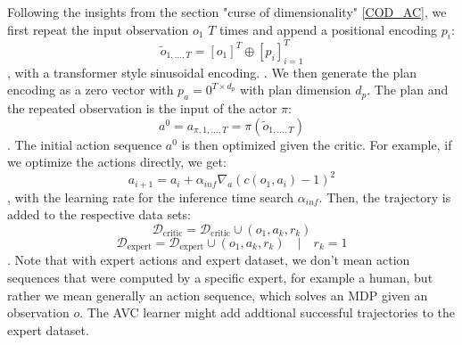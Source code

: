 Following the insights from the section "curse of dimensionality" \ref{COD_AC}, we first repeat the input observation $o_1$ $T$ times and append a positional encoding $p_i$:
\begin{equation}
    \label{eq:seq_emb}
    \tilde{o}_{1, ..., T} = [o_1]^T \oplus [p_i]_{i=1}^T
\end{equation}
, with a transformer style sinusoidal encoding.
. We then generate the plan encoding as a zero vector with $p_a = 0^{T \times d_p}$ with plan dimension $d_p$. The plan and the repeated observation is the input 
of the actor $\pi$:
\begin{equation}
    a^0 = a_{\pi, 1,...,T} = \pi(\tilde{o}_{1, ..., T})
\end{equation}
. The initial action sequence $a^0$ is then optimized given the critic. For example, if we optimize the actions directly, we get:
\begin{equation*}
    a_{i+1} = a_i + \alpha_{inf}\nabla_{a} (c(o_1, a_i) - 1)^2
\end{equation*}
, with the learning rate for the inference time search $\alpha_{inf}$. Then, the trajectory is added to the respective data sets:
\begin{equation}
    \mathcal{D}_{\text{critic}} = \mathcal{D}_{\text{critic}} \cup (o_1, a_k, r_k)
\end{equation}
\begin{equation*}
    \mathcal{D}_{\text{expert}} = \mathcal{D}_{\text{expert}} \cup (o_1, a_k, r_k)\quad |\quad r_k = 1
\end{equation*}
. Note that with expert actions and expert dataset, we don't mean action sequences that were computed by 
a specific expert, for example a human, but rather we mean generally an action sequence, which solves an MDP given an observation $o$. The AVC learner might add 
addtional successful trajectories to the expert dataset. \\


